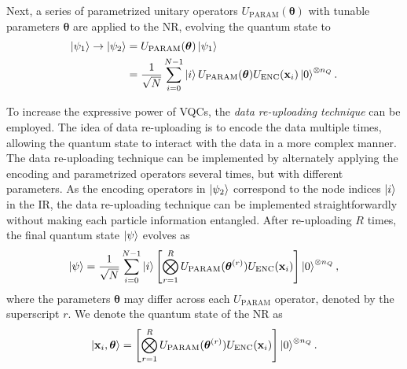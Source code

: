 \documentclass[reprint,amsmath,amssymb,prd,nofootinbib]{revtex4-2}
\def\xbf{\mathbf{x}}
\def\thetabf{\boldsymbol{\theta}}
\def\UENC{U_{\text{ENC}}}
\def\UPARAM{U_{\text{PARAM}}}
\begin{document}
Next, a series of parametrized unitary operators $\UPARAM(\thetabf)$ with tunable parameters $\thetabf$ are applied to the NR, evolving the quantum state to
\begin{equation} \label{psi_2}
    \begin{split}
        \ket{\psi_1} \rightarrow
        \ket{\psi_2} &= \UPARAM(\thetabf)\ket{\psi_1} \\
        &= \frac{1}{\sqrt{N}}\sum^{N-1}_{i=0}\ket{i}\UPARAM(\thetabf)\UENC(\xbf_i)\ket{0}^{\otimes n_Q}.
    \end{split}
\end{equation}

To increase the expressive power of VQCs, the \textit{data re-uploading technique} \cite{reupload} can be employed. The idea of data re-uploading is to encode the data multiple times, allowing the quantum state to interact with the data in a more complex manner. The data re-uploading technique can be implemented by alternately applying the encoding and parametrized operators several times, but with different parameters. As the encoding operators in $\ket{\psi_2}$ correspond to the node indices $\ket{i}$ in the IR, the data re-uploading technique can be implemented straightforwardly without making each particle information entangled. After re-uploading $R$ times, the final quantum state $\ket{\psi}$ evolves as
\begin{equation} \label{psi_final}
    \ket{\psi} = \frac{1}{\sqrt{N}}\sum^{N-1}_{i=0}\ket{i}\Biggl[\bigotimes^{R}_{r=1}\UPARAM(\thetabf^{(r)})\UENC(\xbf_i)\Biggr]\ket{0}^{\otimes n_Q}\\,
\end{equation}
where the parameters $\thetabf$ may differ across each $\UPARAM$ operator, denoted by the superscript $r$. We denote the quantum state of the NR as
\begin{equation*}
    \ket{\xbf_i,\thetabf}=\Biggl[\bigotimes^{R}_{r=1}\UPARAM(\thetabf^{(r)})\UENC(\xbf_i)\Biggr]\ket{0}^{\otimes n_Q}.
\end{equation*}
\end{document}
